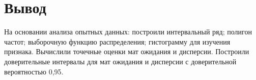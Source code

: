 \documentclass{article}
\begin{document}
\section*{Вывод}
На основании анализа опытных данных: построили интервальный ряд; полигон частот; выборочную функцию распределения; гистограмму для изучения признака.
Вычислили точечные оценки мат ожидания и дисперсии.
Построили доверительные интервалы для мат ожидания и дисперсии с доверительной вероятностью 0,95.
\end{document}
